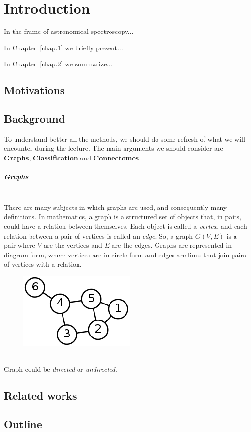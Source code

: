 \chapter{Introduction}
\lettrine[lines=2, findent=3pt, nindent=0pt]{I}{}n the frame of astronomical spectroscopy...

\bigskip
In \hyperref[chap:1]{Chapter~\ref*{chap:1}} we  briefly present...

\bigskip
In \hyperref[chap:2]{Chapter~\ref*{chap:2}} we summarize...
\section{Motivations}
\section{Background}
To understand better all the methods, we should do some refresh of what we will encounter during the lecture. The main arguments we should consider are \textbf{Graphs}, \textbf{Classification} and \textbf{Connectomes}.
\paragraph{Graphs}\
\\
There are many subjects in which graphs are used, and consequently many definitions. In mathematics, a graph is a structured set of objects that, in pairs, could have a relation between themselves. Each object is called a \textit{vertex}, and each relation between a pair of vertices is called an \textit{edge}. So, a graph $ G(V,E) $ is a pair where $ V $ are the vertices and $ E $ are the edges. Graphs are represented in diagram form, where vertices are in circle form and edges are lines that join pairs of vertices with a relation.
\begin{figure}[htbp]
	\centering
	\includegraphics[scale=0.5]{Immagini/220px-6n-graf.svg.png}
	\caption{\label{fig:diagram}}
\end{figure}
\\
Graph could be \textit{directed} or \textit{undirected}. 
\section{Related works}
\section{Outline}